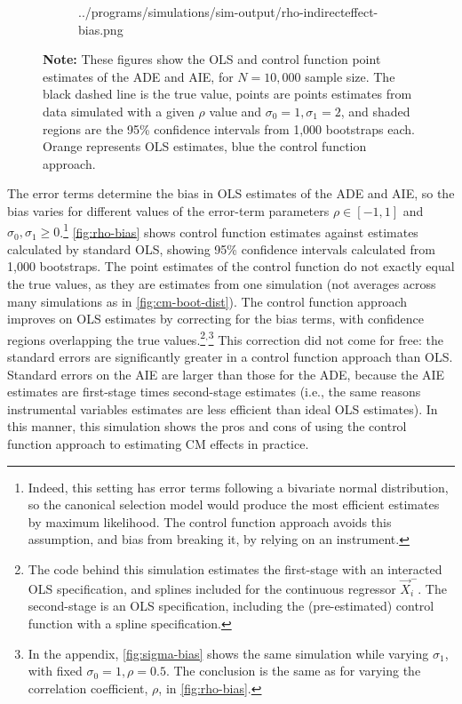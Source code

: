 \begin{figure}[h!]
\begin{subfigure}[c]{0.475\textwidth}
{            ../programs/simulations/sim-output/rho-indirecteffect-bias.png}
    \end{subfigure}
    \label{fig:rho-bias}
    \justify
    \footnotesize    
    \textbf{Note:}
    These figures show the OLS and control function point estimates of the ADE and AIE, for $N = 10,000$ sample size.
    The black dashed line is the true value, points are points estimates from data simulated with a given $\rho$ value and $\sigma_0 = 1, \sigma_1 = 2$, and shaded regions are the 95\% confidence intervals from 1,000 bootstraps each.
    Orange represents OLS estimates, blue the control function approach.
\end{figure}

The error terms determine the bias in OLS estimates of the ADE and AIE, so the bias varies for different values of the error-term parameters $\rho \in [-1, 1]$ and $\sigma_0, \sigma_1 \geq 0$.\footnote{
    Indeed, this setting has error terms following a bivariate normal distribution, so the canonical \cite{heckman1974shadow} selection model would produce the most efficient estimates by maximum likelihood.
    The control function approach avoids this assumption, and bias from breaking it, by relying on an instrument.
}
\autoref{fig:rho-bias} shows control function estimates against estimates calculated by standard OLS, showing 95\% confidence intervals calculated from 1,000 bootstraps.
The point estimates of the control function do not exactly equal the true values, as they are estimates from one simulation (not averages across many simulations as in \autoref{fig:cm-boot-dist}).
The control function approach improves on OLS estimates by correcting for the bias terms, with confidence regions overlapping the true values.\footnote{
    The code behind this simulation estimates the first-stage with an interacted OLS specification, and splines included for the continuous regressor $\vec X_i^-$.
    The second-stage is an OLS specification, including the (pre-estimated) control function with a spline specification.
}$^,$\footnote{
    In the appendix, \autoref{fig:sigma-bias} shows the same simulation while varying $\sigma_1$, with fixed $\sigma_0 = 1, \rho = 0.5$.
    The conclusion is the same as for varying the correlation coefficient, $\rho$, in \autoref{fig:rho-bias}.
}
This correction did not come for free: the standard errors are significantly greater in a control function approach than OLS.
Standard errors on the AIE are larger than those for the ADE, because the AIE estimates are first-stage times second-stage estimates (i.e., the same reasons instrumental variables estimates are less efficient than ideal OLS estimates). 
In this manner, this simulation shows the pros and cons of using the control function approach to estimating CM effects in practice.
